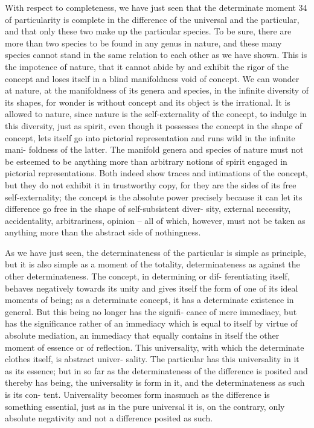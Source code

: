 With respect to completeness, we have just seen that the determinate
moment 34 of particularity is complete in the difference of the universal and
the particular, and that only these two make up the particular species. To
be sure, there are more than two species to be found in any genus in nature,
and these many species cannot stand in the same relation to each other as
we have shown. This is the impotence of nature, that it cannot abide by
and exhibit the rigor of the concept and loses itself in a blind manifoldness
void of concept. We can wonder at nature, at the manifoldness of its genera
and species, in the infinite diversity of its shapes, for wonder is without
concept and its object is the irrational. It is allowed to nature, since nature
is the self-externality of the concept, to indulge in this diversity, just as
spirit, even though it possesses the concept in the shape of concept, lets
itself go into pictorial representation and runs wild in the infinite mani-
foldness of the latter. The manifold genera and species of nature must not
be esteemed to be anything more than arbitrary notions of spirit engaged
in pictorial representations. Both indeed show traces and intimations of
the concept, but they do not exhibit it in trustworthy copy, for they are the
sides of its free self-externality; the concept is the absolute power precisely
because it can let its difference go free in the shape of self-subsistent diver-
sity, external necessity, accidentality, arbitrariness, opinion – all of which,
however, must not be taken as anything more than the abstract side of
nothingness.

As we have just seen, the determinateness of the particular is simple as
principle, but it is also simple as a moment of the totality, determinateness
as against the other determinateness. The concept, in determining or dif-
ferentiating itself, behaves negatively towards its unity and gives itself the
form of one of its ideal moments of being; as a determinate concept, it has
a determinate existence in general. But this being no longer has the signifi-
cance of mere immediacy, but has the significance rather of an immediacy
which is equal to itself by virtue of absolute mediation, an immediacy that
equally contains in itself the other moment of essence or of reflection. This
universality, with which the determinate clothes itself, is abstract univer-
sality. The particular has this universality in it as its essence; but in so far
as the determinateness of the difference is posited and thereby has being,
the universality is form in it, and the determinateness as such is its con-
tent. Universality becomes form inasmuch as the difference is something
essential, just as in the pure universal it is, on the contrary, only absolute
negativity and not a difference posited as such.

